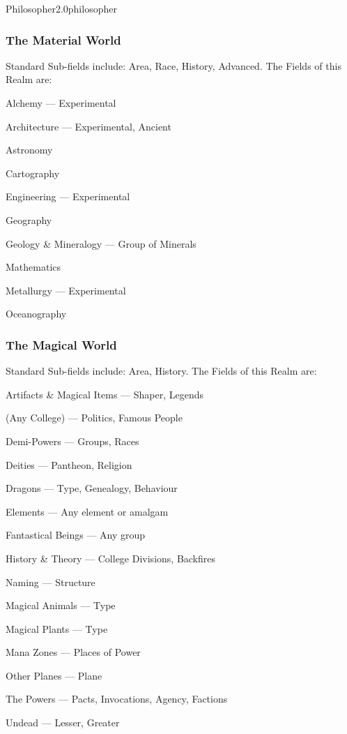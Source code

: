 \begin{skill}{Philosopher}{2.0}{philosopher}
\subsubsection{The Material World}

Standard Sub-fields include: Area, Race, History, Advanced.  The
Fields of this Realm are:

\begin{Itemize}
\item Alchemy --- Experimental
\item Architecture --- Experimental, Ancient
\item Astronomy
\item Cartography
\item Engineering --- Experimental
\item Geography 
\item Geology \& Mineralogy --- Group of Minerals
\item Mathematics
\item Metallurgy --- Experimental
\item Oceanography
\end{Itemize}

\subsubsection{The Magical World}

Standard Sub-fields include: Area, History. The Fields of this Realm
are:

\begin{Itemize}
\item Artifacts \& Magical Items --- Shaper, Legends
\item (Any College) --- Politics, Famous People
\item Demi-Powers --- Groups, Races
\item Deities --- Pantheon, Religion
\item Dragons --- Type, Genealogy, Behaviour
\item Elements --- Any element or amalgam
\item Fantastical Beings --- Any group
\item History \& Theory --- College Divisions, Backfires
\item Naming --- Structure
\item Magical Animals --- Type
\item Magical Plants --- Type
\item Mana Zones --- Places of Power
\item Other Planes --- Plane
\item The Powers --- Pacts, Invocations, Agency, Factions
\item Undead --- Lesser, Greater
\end{Itemize}


\end{skill}
